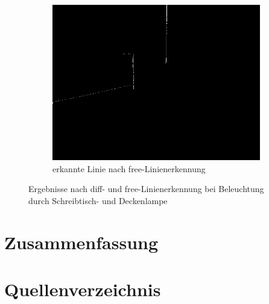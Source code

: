 \documentclass[ngerman,a4paper,parskip=half]{scrartcl}
\begin{document}
\begin{figure}[H]
\begin{subfigure}{0.32\textwidth}
		\includegraphics[width=\textwidth]{includes/blue_dt_free.png}
		\caption{erkannte Linie nach free-Linienerkennung}
		\label{fig:blue_dt_free}
	\end{subfigure}
	\caption{Ergebnisse nach diff- und free-Linienerkennung bei Beleuchtung durch Schreibtisch- und Deckenlampe}
	\label{fig:blue_dt}
\end{figure}




\section{Zusammenfassung}
\label{sec:summary}


\section{Quellenverzeichnis}

\end{document}

